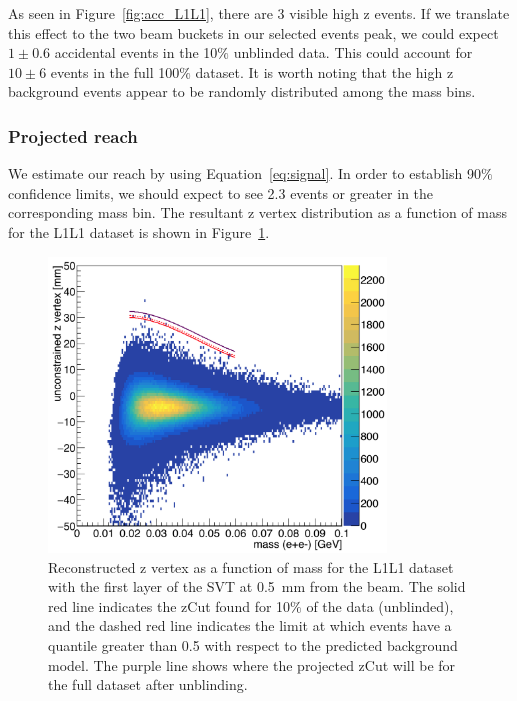 As seen in Figure~\ref{fig:acc_L1L1}, there are 3 visible high z events. If we translate this effect to the two beam buckets in our selected events peak, we could expect $1\pm0.6$ accidental events in the 10$\%$ unblinded data. This could account for $10\pm6$ events in the full 100$\%$ dataset. It is worth noting that the high z background events appear to be randomly distributed among the mass bins.

\subsubsection{Projected reach}

We estimate our reach by using Equation~\eqref{eq:signal}. In order to establish 90$\%$ confidence limits, we should expect to see 2.3 events or greater in the corresponding mass bin. The resultant z vertex distribution as a function of mass for the L1L1 dataset is shown in Figure~\ref{fig:zVm_L1L1}.

\begin{figure}[H]
  \centering
     \includegraphics[width=0.8\textwidth]{plots/zVm_L1L1_0p5.png}
  \caption{Reconstructed z vertex as a function of mass for the L1L1 dataset with the first layer of the SVT at 0.5~mm from the beam. The solid red line indicates the zCut found for 10$\%$ of the data (unblinded), and the dashed red line indicates the limit at which events have a quantile greater than 0.5 with respect to the predicted background model. The purple line shows where the projected zCut will be for the full dataset after unblinding.}
  \label{fig:zVm_L1L1}
\end{figure}

